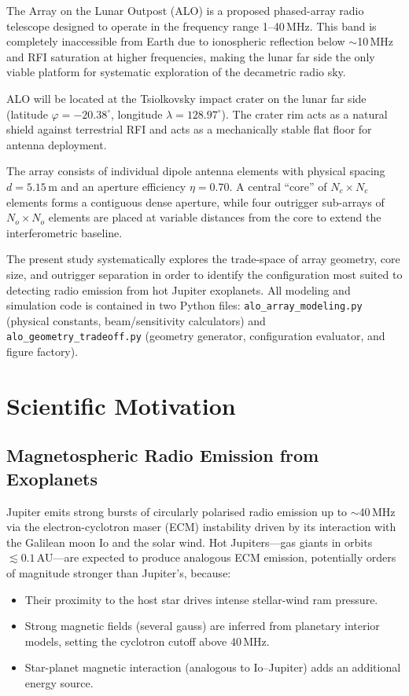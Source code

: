 \documentclass[12pt,a4paper]{article}
\begin{document}
The Array on the Lunar Outpost (ALO) is a proposed phased-array radio telescope
designed to operate in the frequency range 1--40\,MHz.
This band is completely inaccessible from Earth due to ionospheric reflection
below $\sim$10\,MHz and RFI saturation at higher frequencies, making the lunar
far side the only viable platform for systematic exploration of the decametric
radio sky.

ALO will be located at the Tsiolkovsky impact crater on the lunar far side
(latitude $\varphi = -20.38^\circ$, longitude $\lambda = 128.97^\circ$).
The crater rim acts as a natural shield against terrestrial RFI and acts as a
mechanically stable flat floor for antenna deployment.

The array consists of individual dipole antenna elements with physical spacing
$d = 5.15$\,m and an aperture efficiency $\eta = 0.70$.
A central ``core'' of $N_c \times N_c$ elements forms a contiguous dense
aperture, while four outrigger sub-arrays of $N_o \times N_o$ elements are
placed at variable distances from the core to extend the interferometric
baseline.

The present study systematically explores the trade-space of array geometry,
core size, and outrigger separation in order to identify the configuration most
suited to detecting radio emission from hot Jupiter exoplanets.
All modeling and simulation code is contained in two Python files:
\texttt{alo\_array\_modeling.py} (physical constants, beam/sensitivity
calculators) and \texttt{alo\_geometry\_tradeoff.py} (geometry generator,
configuration evaluator, and figure factory).

\section{Scientific Motivation}
\label{sec:motivation}

\subsection{Magnetospheric Radio Emission from Exoplanets}

Jupiter emits strong bursts of circularly polarised radio emission up to
$\sim$40\,MHz via the electron-cyclotron maser (ECM) instability driven by its
interaction with the Galilean moon Io and the solar wind.
Hot Jupiters---gas giants in orbits $\lesssim 0.1$\,AU---are expected to
produce analogous ECM emission, potentially orders of magnitude stronger than
Jupiter's, because:
\begin{itemize}
  \item Their proximity to the host star drives intense stellar-wind ram
    pressure.
  \item Strong magnetic fields (several gauss) are inferred from planetary
    interior models, setting the cyclotron cutoff above 40\,MHz.
  \item Star-planet magnetic interaction (analogous to Io--Jupiter) adds an
    additional energy source.
\end{itemize}
\end{document}
